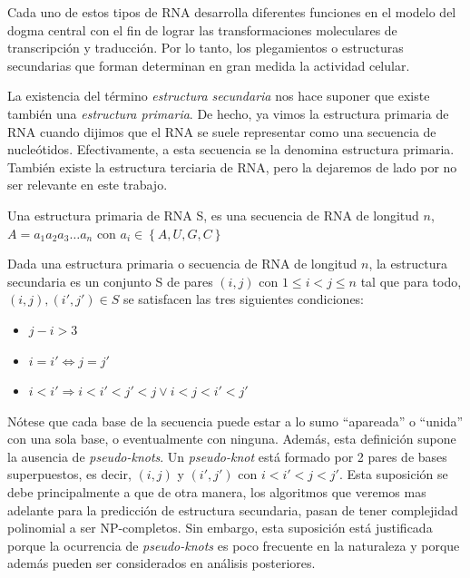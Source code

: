Cada uno de estos tipos de \ac{RNA} desarrolla diferentes funciones en el
modelo del dogma central con el fin de lograr las transformaciones moleculares
de transcripci\'on y traducci\'on. Por lo tanto, los plegamientos o estructuras
secundarias que forman determinan en gran medida la actividad celular.

La existencia del t\'ermino \textit{estructura secundaria} nos hace suponer que
existe tambi\'en una \textit{estructura primaria}. De hecho, ya vimos la
estructura primaria de \ac{RNA} cuando dijimos que el \ac{RNA} se suele
representar como una secuencia de nucle\'otidos. Efectivamente, a esta secuencia
se la denomina estructura primaria. Tambi\'en existe la estructura terciaria de
\ac{RNA}, pero la dejaremos de lado por no ser relevante en este trabajo.

\begin{definition}
\label{rna_primary}
Una estructura primaria de \ac{RNA} S, es una secuencia de \ac{RNA} de longitud
$n$, $A=a_{1}a_{2}a_{3}\dots a_{n}$ con $a_{i} \in \left\lbrace A, U, G, C
\right\rbrace$ 
\end{definition}

\begin{definition}
\label{rna_secondary}
Dada una estructura primaria o secuencia de \ac{RNA} de longitud $n$, la
estructura secundaria es un conjunto S de pares $(i,j)$ con $1\leq i < j \leq
n$ tal que para todo, $(i,j), (i',j') \in S$ se satisfacen las tres siguientes
condiciones:
\begin{itemize}
 \item $j-i > 3$
 \item $i=i' \Leftrightarrow j=j'$
 \item $i< i'\Rightarrow i < i' < j' < j \lor i < j < i' < j'$ 
\end{itemize}
\end{definition}

N\'otese que cada base de la secuencia puede estar a lo sumo ``apareada'' o
``unida'' con una sola base, o eventualmente con ninguna. Adem\'as, esta
definici\'on supone la ausencia de \textit{pseudo-knots}. Un
\textit{pseudo-knot} est\'a formado por 2 pares de bases superpuestos, es decir,
$(i,j)$ y $(i',j')$ con $i < i' < j < j'$. Esta suposici\'on se debe
principalmente a que de otra manera, los algoritmos que veremos mas adelante
para la predicci\'on de estructura secundaria, pasan de tener complejidad
polinomial a ser NP-completos\cite{Lyngso00}. Sin embargo, esta suposici\'on
est\'a justificada porque la ocurrencia de \textit{pseudo-knots} es poco
frecuente  en la naturaleza y porque adem\'as pueden ser considerados en
an\'alisis posteriores\cite{Zuker84}.

